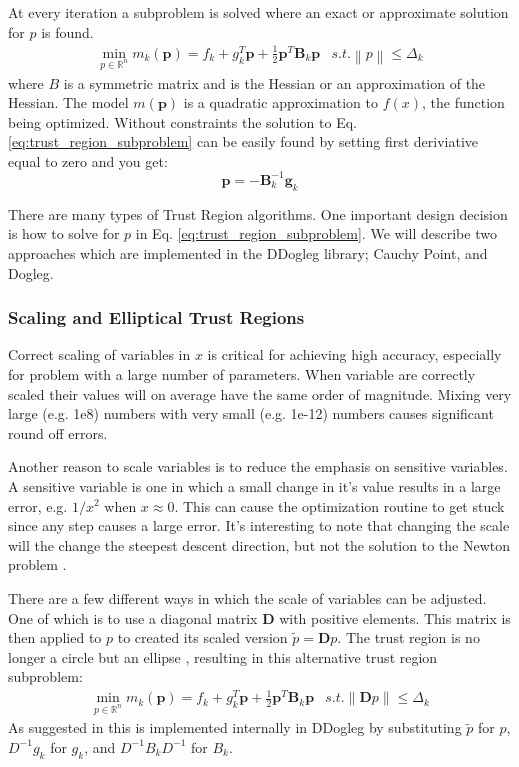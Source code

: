 \documentclass[peerreview,compsoc,onecolumn]{IEEEtran}
\newcommand{\R}{\mathbb{R}}
\newcommand{\norm}[1]{\left\lVert#1\right\rVert}
\begin{document}
At every iteration a subproblem is solved where an exact or approximate solution for $p$ is found.
\begin{equation}
\begin{array}{lr}
\min\limits_{p\in \R^n} m_k(\bm{p}) = f_k + g^T_k \bm{p} + \frac{1}{2}\bm{p}^T \bm{B}_k \bm{p} & s.t. \norm{p} \le \Delta_k
\end{array}
\label{eq:trust_region_subproblem}
\end{equation}
where $B$ is a symmetric matrix and is the Hessian or an approximation of the Hessian. The model $m(\bm{p})$ is a quadratic approximation to $f(x)$, the function being optimized. Without constraints  the solution to Eq. \ref{eq:trust_region_subproblem} can be easily found by setting first deriviative equal to zero and you get:
\begin{equation}
\bm{p} = -\bm{B}^{-1}_k \bm{g}_k
\label{eq:TR_unconstrained_solution}
\end{equation}

There are many types of Trust Region algorithms. One important design decision is how to solve for $p$ in Eq. \ref{eq:trust_region_subproblem}. We will describe two approaches which are implemented in the DDogleg library; Cauchy Point, and Dogleg.

\subsubsection{Scaling and Elliptical Trust Regions} 

Correct scaling of variables in $x$ is critical for achieving high accuracy, especially for problem with a large number of parameters. When variable are correctly scaled their values will on average have the same order of magnitude. Mixing very large (e.g. 1e8) numbers with very small (e.g. 1e-12) numbers causes significant round off errors. 

Another reason to scale variables is to reduce the emphasis on sensitive variables. A sensitive variable is one in which a small change in it's value results in a large error, e.g. $1/x^2$ when $x \approx 0$. This can cause the optimization routine to get stuck since any step causes a large error. It's interesting to note that changing the scale will the change the steepest descent direction, but not the solution to the Newton problem \cite{dennis1996}. 

There are a few different ways in which the scale of variables can be adjusted. One of which is to use a diagonal matrix $\bm{D}$ with positive elements. This matrix is then applied to $p$ to created its scaled version $\tilde{p} = \bm{D}p$. The trust region is no longer a circle but an ellipse \cite{numopt2006}, resulting in this alternative trust region subproblem:
\begin{equation}
\begin{array}{lr}
\min\limits_{p\in \R^n} m_k(\bm{p}) = f_k + g^T_k \bm{p} + \frac{1}{2}\bm{p}^T \bm{B}_k \bm{p} & s.t. \norm{\bm{D}p} \le \Delta_k
\end{array}
\end{equation}
As suggested in \cite{numopt2006} this is implemented internally in DDogleg by substituting $\tilde{p}$ for $p$, $D^{-1}g_k$ for $g_k$, and $D^{-1}B_k D^{-1}$ for $B_k$.  
\end{document}
